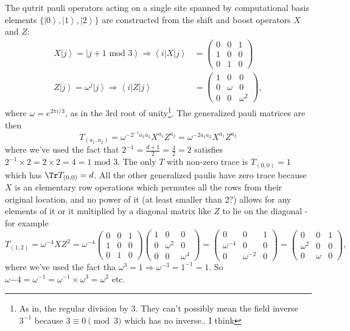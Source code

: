 \documentclass{report}
\begin{document}
 The qutrit pauli operators acting on a single site spanned by computational basis elements $\{\left|0\right>,\left|1\right>,\left|2\right>\}$ are constructed from the shift and boost operators $X$ and $Z$:
 \begin{align} 
 X\left|j\right>=\left|j+1\text{ mod }3\right>\Rightarrow \left<i|X|j\right>&=\begin{pmatrix}0&0&1\\1&0&0\\0&1&0\end{pmatrix}\\
 Z\left|j\right>=\omega^j\left|j\right>\Rightarrow \left<i|Z|j\right>&=\begin{pmatrix}1&0&0\\0&\omega&0\\0&0&\omega^2\end{pmatrix},\end{align}
 where $\omega=e^{2\pi i/3}$, as in the 3rd root of unity\footnote{As in, the regular division by 3. They can't possibly mean the field inverse $3^{-1}$ because $3\equiv 0\pmod 3$ which has no inverse.. I think}. The generalized pauli matrices are then
 \begin{equation}T_{(a_1,a_2)}=\omega^{-2^{-1}a_1a_2}X^{a_1}Z^{a_2}=\omega^{-2a_1a_2}X^{a_1}Z^{a_2}\end{equation}
 where we've used the fact that $2^{-1}=\frac{d+1}{2}=\frac{4}{2}=2$ satisfies $2^{-1}\times 2=2\times 2=4=1\text{ mod }3$. The only $T$ with non-zero trace is $T_{(0,0)}=1$ which has $\Tr T_{(0,0)}=d$. All the other generalized paulis have zero trace because $X$ is an elementary row operations which permutes all the rows from their original location, and no power of it (at least smaller than 2?) allows for any elements of it or it multiplied by a diagonal matrix like $Z$ to lie on the diagonal - for example 
 \begin{equation}T_{(1,2)}=\omega^{-4}XZ^2=\omega^{-4}\begin{pmatrix}0&0&1\\1&0&0\\0&1&0\end{pmatrix}\begin{pmatrix}1&0&0\\0&\omega^2&0\\0&0&\omega^4\end{pmatrix}=\begin{pmatrix}0&0&1\\\omega^{-4}&0&0\\0&\omega^{-2}&0\end{pmatrix}=\begin{pmatrix}0&0&1\\\omega^2&0&0\\0&\omega&0\end{pmatrix},\end{equation}
 where we've used the fact tha $\omega^3=1\Rightarrow \omega^{-3}=1^{-1}=1$. So $\omega{-4}=\omega^{-1}=\omega^{-1}\times\omega^{3}=\omega^2$ etc.
 
\end{document}
